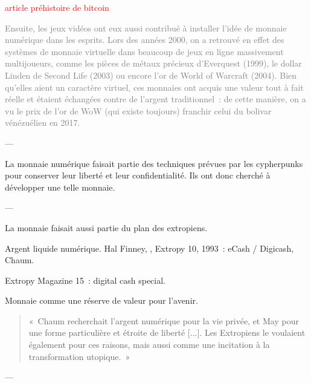 \textcolor{red}{article préhistoire de bitcoin}

\textcolor{gray}{Ensuite, les jeux vidéos ont eux aussi contribué à installer l'idée de monnaie numérique dans les esprits. Lors des années 2000, on a retrouvé en effet des systèmes de monnaie virtuelle dans beaucoup de jeux en ligne massivement multijoueurs, comme les pièces de métaux précieux d'Everquest (1999), le dollar Linden de Second Life (2003) ou encore l'or de World of Warcraft (2004). Bien qu'elles aient un caractère virtuel, ces monnaies ont acquis une valeur tout à fait réelle et étaient échangées contre de l'argent traditionnel~: de cette manière, on a vu le prix de l'or de WoW (qui existe toujours) franchir celui du bolivar vénézuélien en 2017.}

---

La monnaie numérique faisait partie des techniques prévues par les cypherpunks pour conserver leur liberté et leur confidentialité. Ils ont donc cherché à développer une telle monnaie.



---

La monnaie faisait aussi partie du plan des extropiens.

Argent liquide numérique. Hal Finney, , Extropy 10, 1993~: eCash / Digicash, Chaum.

Extropy Magazine 15~: digital cash special.

Monnaie comme une réserve de valeur pour l'avenir.

\begin{quote}
«~Chaum recherchait l'argent numérique pour la vie privée, et May pour une forme particulière et étroite de liberté [...]. Les Extropiens le voulaient également pour ces raisons, mais aussi comme une incitation à la transformation utopique.~»
\end{quote}

---

